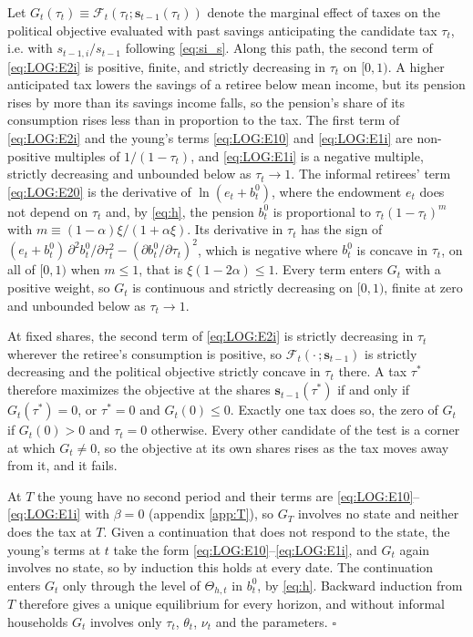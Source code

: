 Let $G_t(\tau_t) \equiv \mathcal{F}_t(\tau_t; \bm{s}_{t-1}(\tau_t))$ denote the marginal effect of taxes on the political objective evaluated with past savings anticipating the candidate tax $\tau_t$, i.e. with $s_{t-1,i}/s_{t-1}$ following \eqref{eq:si_s}. Along this path, the second term of \eqref{eq:LOG:E2i} is positive, finite, and strictly decreasing in $\tau_t$ on $[0,1)$. A higher anticipated tax lowers the savings of a retiree below mean income, but its pension rises by more than its savings income falls, so the pension's share of its consumption rises less than in proportion to the tax. The first term of \eqref{eq:LOG:E2i} and the young's terms \eqref{eq:LOG:E10} and \eqref{eq:LOG:E1i} are non-positive multiples of $1/(1-\tau_t)$, and \eqref{eq:LOG:E1i} is a negative multiple, strictly decreasing and unbounded below as $\tau_t \to 1$. The informal retirees' term \eqref{eq:LOG:E20} is the derivative of $\ln(e_t+b_t^0)$, where the endowment $e_t$ does not depend on $\tau_t$ and, by \eqref{eq:h}, the pension $b_t^0$ is proportional to $\tau_t(1-\tau_t)^m$ with $m \equiv (1-\alpha)\xi/(1+\alpha\xi)$. Its derivative in $\tau_t$ has the sign of $(e_t+b_t^0)\,\partial^2b_t^0/\partial\tau_t^2-(\partial b_t^0/\partial\tau_t)^2$, which is negative where $b_t^0$ is concave in $\tau_t$, on all of $[0,1)$ when $m \leq 1$, that is $\xi(1-2\alpha) \leq 1$. Every term enters $G_t$ with a positive weight, so $G_t$ is continuous and strictly decreasing on $[0,1)$, finite at zero and unbounded below as $\tau_t \to 1$.


At fixed shares, the second term of \eqref{eq:LOG:E2i} is strictly decreasing in $\tau_t$ wherever the retiree's consumption is positive, so $\mathcal{F}_t(\cdot\,; \bm{s}_{t-1})$ is strictly decreasing and the political objective strictly concave in $\tau_t$ there. A tax $\tau^{\ast}$ therefore maximizes the objective at the shares $\bm{s}_{t-1}(\tau^{\ast})$ if and only if $G_t(\tau^{\ast}) = 0$, or $\tau^{\ast} = 0$ and $G_t(0) \leq 0$. Exactly one tax does so, the zero of $G_t$ if $G_t(0) > 0$ and $\tau_t = 0$ otherwise. Every other candidate of the test is a corner at which $G_t \neq 0$, so the objective at its own shares rises as the tax moves away from it, and it fails.


At $T$ the young have no second period and their terms are \eqref{eq:LOG:E10}--\eqref{eq:LOG:E1i} with $\beta = 0$ (appendix \ref{app:T}), so $G_T$ involves no state and neither does the tax at $T$. Given a continuation that does not respond to the state, the young's terms at $t$ take the form \eqref{eq:LOG:E10}--\eqref{eq:LOG:E1i}, and $G_t$ again involves no state, so by induction this holds at every date. The continuation enters $G_t$ only through the level of $\Theta_{h,t}$ in $b_t^0$, by \eqref{eq:h}. Backward induction from $T$ therefore gives a unique equilibrium for every horizon, and without informal households $G_t$ involves only $\tau_t$, $\theta_t$, $\nu_t$ and the parameters. $\square$

